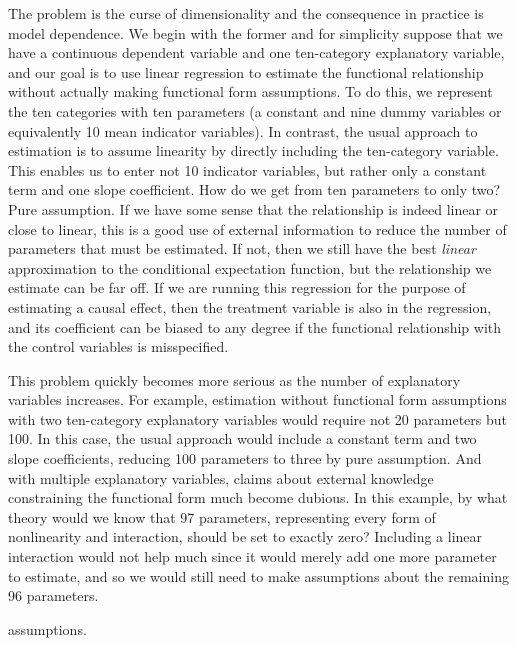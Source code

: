 \documentclass[11pt,titlepage]{article}
\begin{document}
The problem is the curse of dimensionality and the consequence in
practice is model dependence.  We begin with the former and for
simplicity suppose that we have a continuous dependent variable and
one ten-category explanatory variable, and our goal is to use linear
regression to estimate the functional relationship without actually
making functional form assumptions.  To do this, we represent the ten
categories with ten parameters (a constant and nine dummy variables or
equivalently 10 mean indicator variables).  In contrast, the usual
approach to estimation is to assume linearity by directly including
the ten-category variable.  This enables us to enter not 10 indicator
variables, but rather only a constant term and one slope coefficient.
How do we get from ten parameters to only two?  Pure assumption.  If
we have some sense that the relationship is indeed linear or close to
linear, this is a good use of external information to reduce the
number of parameters that must be estimated.  If not, then we still
have the best {\it linear} approximation to the conditional
expectation function, but the relationship we estimate can be far off.
If we are running this regression for the purpose of estimating a
causal effect, then the treatment variable is also in the regression,
and its coefficient can be biased to any degree if the functional
relationship with the control variables is misspecified.

This problem quickly becomes more serious as the number of explanatory
variables increases.  For example, estimation without functional form
assumptions with two ten-category explanatory variables would require
not 20 parameters but 100.  In this case, the usual approach would
include a constant term and two slope coefficients, reducing 100
parameters to three by pure assumption.  And with multiple explanatory
variables, claims about external knowledge constraining the functional
form much become dubious.  In this example, by what theory would we
know that 97 parameters, representing every form of nonlinearity and
interaction, should be set to exactly zero?  Including a linear
interaction would not help much since it would merely add one more
parameter to estimate, and so we would still need to make assumptions
about the remaining 96 parameters.

assumptions. %
\end{document}
